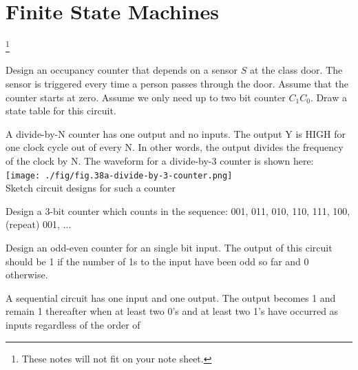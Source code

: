\section{Finite State Machines~\cite[Sec~3.4]{harris2022digital}}\footnote{These
  notes will not fit on your note sheet.}

\begin{example}
  Design an occupancy counter that depends on a
  sensor $S$ at the class door. The sensor is triggered every time a person passes
  through the door. Assume that the counter starts at zero. Assume
  we only need up to two bit counter $C_1C_0$. Draw a state table for this
  circuit.
\end{example}

\begin{prob}
  A divide-by-N counter has one output and no inputs. The output Y is HIGH for
  one clock cycle out of every N. In other words, the output divides the frequency
  of the clock by N. The waveform for a divide-by-3 counter is shown here:\\
  \texttt{[image: ./fig/fig.38a-divide-by-3-counter.png]}\\
  Sketch circuit designs for such a counter
\end{prob}

\begin{prob}
  Design a 3-bit counter which counts in the sequence:
  001, 011, 010, 110, 111, 100, (repeat) 001, ...
\end{prob}

\begin{example}
  Design an odd-even counter for an single bit input. The output of this circuit
  should be 1 if the number of 1s to the input have been odd so far and 0
  otherwise.
\end{example}

\begin{example}
  A sequential circuit has one input and one output. The output becomes 1 and
  remain 1 thereafter when at least two 0's and at least two 1's have occurred
  as inputs regardless of the order of 
\end{example}

